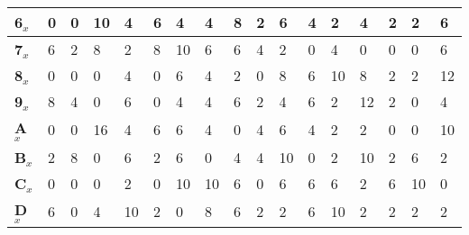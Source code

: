 \begin{longtable}[c]{|l|l|l|l|l|l|l|l|l|l|l|l|l|l|l|l|l|}
\textbf{6$_x$}  & 0              & 0              & 10             & 4              & 6              & 4              & 4              & 8              & 2              & 6              & 4              & 2              & 4              & 2              & 2              & 6              \\ \hline
\textbf{7$_x$}  & 6              & 2              & 8              & 2              & 8              & 10             & 6              & 6              & 4              & 2              & 0              & 4              & 0              & 0              & 0              & 6              \\ \hline
\textbf{8$_x$}  & 0              & 0              & 0              & 4              & 0              & 6              & 4              & 2              & 0              & 8              & 6              & 10             & 8              & 2              & 2              & 12             \\ \hline
\textbf{9$_x$}  & 8              & 4              & 0              & 6              & 0              & 4              & 4              & 6              & 2              & 4              & 6              & 2              & 12             & 2              & 0              & 4              \\ \hline
\textbf{A$_x$}  & 0              & 0              & 16             & 4              & 6              & 6              & 4              & 0              & 4              & 6              & 4              & 2              & 2              & 0              & 0              & 10             \\ \hline
\textbf{B$_x$}  & 2              & 8              & 0              & 6              & 2              & 6              & 0              & 4              & 4              & 10             & 0              & 2              & 10             & 2              & 6              & 2              \\ \hline
\textbf{C$_x$}  & 0              & 0              & 0              & 2              & 0              & 10             & 10             & 6              & 0              & 6              & 6              & 6              & 2              & 6              & 10             & 0              \\ \hline
\textbf{D$_x$}  & 6              & 0              & 4              & 10             & 2              & 0              & 8              & 6              & 2              & 2              & 6              & 10             & 2              & 2              & 2              & 2              \\ \hline

\end{longtable}
